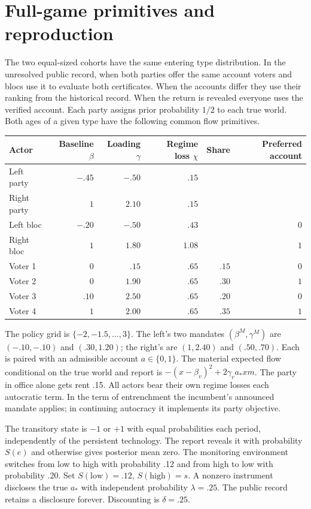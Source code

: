 \documentclass[11pt,letterpaper]{article}
\begin{document}
\newpage
\appendix
\section{Full-game primitives and reproduction}\label{app:params}
The two equal-sized cohorts have the same entering type distribution. In the unresolved public record, when both parties offer the same account voters and blocs use it to evaluate both certificates. When the accounts differ they use their ranking from the historical record. When the return is revealed everyone uses the verified account. Each party assigns prior probability \(1/2\) to each true world. Both ages of a given type have the following common flow primitives.

\begin{center}\small
\begin{tabular}{@{}lrrrrr@{}}\toprule
Actor & Baseline \(\beta\) & Loading \(\gamma\) & Regime loss \(\chi\) & Share & Preferred account\\\midrule
Left party & $-.45$ & $-.50$ & $.15$ & & \\
Right party & $1$ & $2.10$ & $.15$ & & \\
Left bloc & $-.20$ & $-.50$ & $.43$ & & $0$\\
Right bloc & $1$ & $1.80$ & $1.08$ & & $1$\\[2pt]
Voter 1 & $0$ & $.15$ & $.65$ & $.15$ & $0$\\
Voter 2 & $0$ & $1.90$ & $.65$ & $.30$ & $1$\\
Voter 3 & $.10$ & $2.50$ & $.65$ & $.20$ & $0$\\
Voter 4 & $1$ & $2.00$ & $.65$ & $.35$ & $1$\\\bottomrule
\end{tabular}
\end{center}
The policy grid is \(\{-2,-1.5,\dots,3\}\). The left's two mandates \((\beta^M,\gamma^M)\) are \((-.10,-.10)\) and \((.30,1.20)\); the right's are \((1,2.40)\) and \((.50,.70)\). Each is paired with an admissible account \(a\in\{0,1\}\). The material expected flow conditional on the true world and report is \(-(x-\beta_v)^2+2\gamma_v a_*xm\). The party in office alone gets rent .15. All actors bear their own regime losses each autocratic term. In the term of entrenchment the incumbent's announced mandate applies; in continuing autocracy it implements its party objective.

The transitory state is \(-1\) or \(+1\) with equal probabilities each period, independently of the persistent technology. The report reveals it with probability \(S(e)\) and otherwise gives posterior mean zero. The monitoring environment switches from low to high with probability .12 and from high to low with probability .20. Set \(S(\mathrm{low})=.12\), \(S(\mathrm{high})=s\). A nonzero instrument discloses the true \(a_*\) with independent probability \(\lambda=.25\). The public record retains a disclosure forever. Discounting is \(\delta=.25\).
\end{document}
